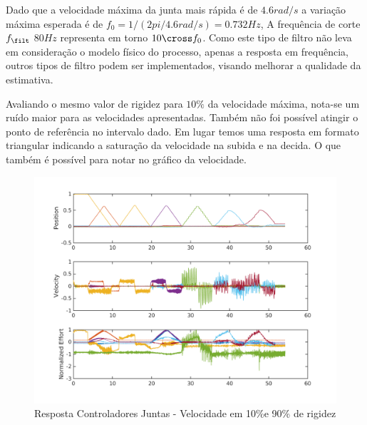 
Dado que a velocidade máxima da junta mais rápida é de $4.6 rad/s$ a variação máxima esperada é de $f_0 = 1/(2pi/4.6 rad/s) = 0.732 Hz$, A frequência de corte $f_{\filt}$ $80Hz$ representa em torno $10 \cross f_0$. Como este tipo de filtro não leva em consideração o modelo físico do processo, apenas a resposta em frequência, outros tipos de filtro podem ser implementados, visando melhorar a qualidade da estimativa.

Avaliando o mesmo valor de rigidez para $10\%$ da velocidade máxima, nota-se um ruído maior para as velocidades apresentadas. Também não foi possível atingir o ponto de referência no intervalo dado. Em lugar temos uma resposta em formato triangular indicando a saturação da velocidade na subida e na decida. O que também é possível para notar no gráfico da velocidade.

\begin{figure}[H]
    \centering
    \includegraphics[width = \linewidth]{tex/figs/jointIdentificationSpeed10p_stiff90p2.png}
    \caption{Resposta Controladores Juntas - Velocidade em 10\%e 90\% de rigidez}
    \label{fig:jointIdentificationSpeed10p_stiff90p2}
\end{figure}

